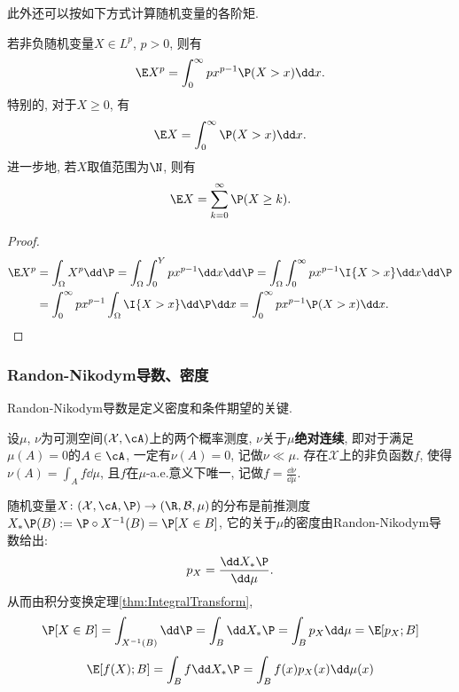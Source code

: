 此外还可以按如下方式计算随机变量的各阶矩. 
\begin{lemma}\label{lemma:trickOfExpectation}
	若非负随机变量$X \in L^p$, $p > 0$, 则有
	\begin{equation}
		\E X^p = \int_0^{\infty} p x^{p-1} \P(X > x) \dd x. 
	\end{equation}
	特别的, 对于$X \geq 0$, 有
	\begin{equation*}
		\E X = \int_0^{\infty} \P(X > x) \dd x. 
	\end{equation*}
	进一步地, 若$X$取值范围为$\N$, 则有
	\begin{equation*}
		\E X = \sum_{k=0}^{\infty} \P(X \geq k). 
	\end{equation*}
\end{lemma}
\begin{proof}
	\begin{align*}
		\E X^p 
		&= \int_\Omega X^p \dd \P 
		= \int_\Omega \int_0^Y p x^{p-1} \dd x \dd \P 
		= \int_\Omega \int_0^{\infty} p x^{p-1} \I{X > x} \dd x \dd \P \\
		&= \int_0^{\infty} p x^{p-1} \int_\Omega \I{X > x} \dd \P \dd x
		= \int_0^{\infty} p x^{p-1} \P(X > x) \dd x.
	\end{align*}
\end{proof}


\subsubsection{Randon-Nikodym导数、密度}

Randon-Nikodym导数是定义密度和条件期望的关键. 

\begin{theorem}
	设$\mu$, $\nu$为可测空间$(\mathcal{X}, \cA)$上的两个概率测度, $\nu$关于$\mu$\textbf{绝对连续}, 即对于满足$\mu(A) = 0$的$A \in \cA$, 一定有$\nu(A) = 0$, 记做$\nu \ll \mu$. 
	存在$\mathcal{X}$上的非负函数$f$, 使得$\nu(A) = \int_A f \dd \mu$, 且$f$在$\mu$-a.e.意义下唯一, 记做$f = \frac{\dd \nu}{\dd \mu}$. 
\end{theorem}

\begin{example}[分布的密度]
	随机变量$X \colon (\mathcal{X}, \cA, \P) \to (\R, \mathcal{B}, \mu)$的分布是前推测度$X_* \P (B) := \P \circ X^{-1} (B) = \P[X \in B]$, 它的关于$\mu$的密度由Randon-Nikodym导数给出: 
	\begin{equation*}
		p_X = \frac{\dd X_* \P}{\dd \mu}. 
	\end{equation*}
	从而由积分变换定理\ref{thm:IntegralTransform}, 
	\begin{equation*}
		\P[X \in B] 
		= \int_{X^{-1}(B)} \dd \P 
		= \int_B \dd X_* \P 
		= \int_B p_X \dd \mu
		= \E[p_X; B]
	\end{equation*}
	\begin{equation*}
		\E[f(X); B]
		= \int_B f \dd X_* \P 
		= \int_B f(x) p_X(x) \dd \mu(x)
	\end{equation*}
\end{example}

